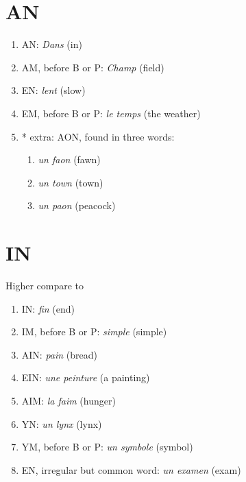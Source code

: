 \documentclass{book}
\begin{document}
    \section{AN \textipa{[\~{a}]}}
        \begin{enumerate}
            \item AN: \textit{Dans} \textipa{[d\~{a}]} (in)
            \item AM, before B or P: \textit{Champ} \textipa{[S\~{a}]} (field)
            \item EN: \textit{lent} \textipa{[l\~{a}]} (slow)
            \item EM, before B or P: \textit{le temps} \textipa{[l@ t\~{a}]} (the weather)
            \item * extra: AON, found in three words:
                \begin{enumerate}
                    \item \textit{un faon} \textipa{[f\~{a}]} (fawn)
                    \item \textit{un town} \textipa{[t\~{a}]} (town)
                    \item \textit{un paon} \textipa{[p\~{a}]} (peacock)
                \end{enumerate}
        \end{enumerate}
    
    \section{IN \textipa{[\~{E}]}}
        Higher compare to \textipa{[\~{œ}]}
        \begin{enumerate}
            \item IN: \textit{fin} \textipa{[f\~{E}]} (end)
            \item IM, before B or P: \textit{simple} \textipa{[s\~{E}pl]} (simple)
            \item AIN: \textit{pain} \textipa{[p\~{E}]} (bread)
            \item EIN: \textit{une peinture} \textipa{[yn p\~{E}tyR]} (a painting)
            \item AIM: \textit{la faim} \textipa{[la f\~{E}]} (hunger)
            \item YN: \textit{un lynx} \textipa{[l\~{E}ks]} (lynx)
            \item YM, before B or P: \textit{un symbole} \textipa{[s\~{E}bOl]} (symbol)
            \item EN, irregular but common word: \textit{un examen} \textipa{[Egzam\~{E}]} (exam)
        \end{enumerate}
    
\end{document}
